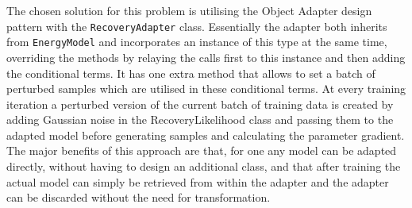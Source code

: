 The chosen solution for this problem is utilising the Object Adapter design pattern with the \texttt{RecoveryAdapter} class.
Essentially the adapter both inherits from \texttt{EnergyModel} and incorporates an instance of this type at the same time,
overriding the methods by relaying the calls first to this instance and then adding the conditional terms.
It has one extra method that allows to set a batch of perturbed samples which are utilised in these conditional terms.
At every training iteration a perturbed version of the current batch of training data is created by adding Gaussian noise in the RecoveryLikelihood class 
and passing them to the adapted model before generating samples and calculating the parameter gradient.
The major benefits of this approach are that, for one any model can be adapted directly, without having to design an additional class,
and that after training the actual model can simply be retrieved from within the adapter and the adapter can be discarded without the need for transformation.



























